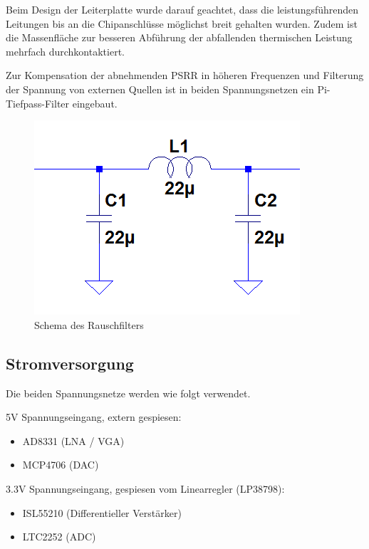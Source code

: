 Beim Design der Leiterplatte wurde darauf geachtet, dass die leistungsführenden Leitungen bis an die Chipanschlüsse möglichst breit gehalten wurden. Zudem ist die Massenfläche zur besseren Abführung der abfallenden thermischen Leistung mehrfach durchkontaktiert.

Zur Kompensation der abnehmenden PSRR in höheren Frequenzen und Filterung der Spannung von externen Quellen ist in beiden Spannungsnetzen ein Pi-Tiefpass-Filter eingebaut.

\begin{figure}[H]
	\begin{center}
		\includegraphics[clip,scale=0.4]{data/images/powerfilter}
		\caption{Schema des Rauschfilters}
		\label{fig:powerfilter}
	\end{center}
\end{figure}


\subsection{Stromversorgung}
Die beiden Spannungsnetze werden wie folgt verwendet.

5V Spannungseingang, extern gespiesen:

\begin{itemize}  
	\item AD8331 (LNA / VGA)
	\item MCP4706 (DAC)
\end{itemize}

3.3V Spannungseingang, gespiesen vom Linearregler (LP38798):

\begin{itemize}  
	\item ISL55210 (Differentieller Verstärker)
	\item LTC2252 (ADC)
\end{itemize}

